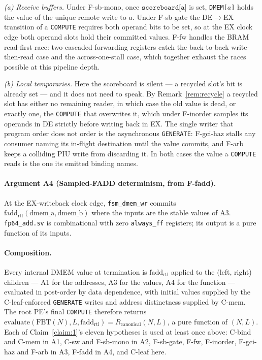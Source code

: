 \documentclass[journal,10pt]{IEEEtran}
\theoremstyle{plain}
\theoremstyle{definition}
\theoremstyle{remark}
\newcommand{\FBT}{\ensuremath{\mathrm{FBT}}}
\newcommand{\fadd}{\ensuremath{\mathrm{fadd}_{\mathrm{rtl}}}}
\newcommand{\Rcan}{\ensuremath{R_{\mathrm{canonical}}}}
\newcommand{\sv}[1]{\texttt{#1}}
\begin{document}
\emph{(a) Receive buffers.} Under \textsf{F-sb-mono}, once
$\texttt{scoreboard[a]}$ is set, \texttt{DMEM[$a$]} holds the value of the
unique remote write to $a$. Under \textsf{F-sb-gate} the
\textsf{DE}$\to$\textsf{EX} transition of a \texttt{COMPUTE} requires both
operand bits to be set, so at the EX clock edge both operand slots hold
their committed values. \textsf{F-fw} handles the BRAM read-first race:
two cascaded forwarding registers catch the back-to-back write-then-read
case and the across-one-stall case, which together exhaust the races
possible at this pipeline depth.

\emph{(b) Local temporaries.} Here the scoreboard is silent --- a recycled
slot's bit is already set --- and it does not need to speak. By
Remark~\ref{rem:recycle} a recycled slot has either no remaining reader,
in which case the old value is dead, or exactly one, the \texttt{COMPUTE}
that overwrites it, which under \textsf{F-inorder} samples its operands in
\textsf{DE} strictly before writing back in \textsf{EX}. The single writer
that program order does not order is the asynchronous \texttt{GENERATE}:
\textsf{F-gci-haz} stalls any consumer naming its in-flight destination
until the value commits, and \textsf{F-arb} keeps a colliding PIU write
from discarding it. In both cases the value a \texttt{COMPUTE} reads is
the one its emitted binding names.

\paragraph{Argument A4 (Sampled-FADD determinism, from \textsf{F-fadd}).}
At the EX-writeback clock edge, \sv{fsm\_dmem\_wr} commits
$\fadd(\text{dmem\_a}, \text{dmem\_b})$ where the inputs are the stable
values of A3. \sv{fp64\_add.sv} is combinational with zero \sv{always\_ff}
registers; its output is a pure function of its inputs.

\paragraph{Composition.} Every internal DMEM value at termination is
$\fadd$ applied to the (left, right) children --- A1 for the addresses, A3
for the values, A4 for the function --- evaluated in post-order by data
dependence, with initial values supplied by the \textsf{C-leaf}-enforced
\texttt{GENERATE} writes and address distinctness supplied by
\textsf{C-mem}. The root PE's final \texttt{COMPUTE} therefore returns
$\mathrm{evaluate}(\FBT(N), L, \fadd) = \Rcan(N, L)$, a pure function of
$(N, L)$. Each of Claim~\ref{claim:1}'s eleven hypotheses is used at least
once above: \textsf{C-bind} and \textsf{C-mem} in A1, \textsf{C-sw} and
\textsf{F-sb-mono} in A2, \textsf{F-sb-gate}, \textsf{F-fw},
\textsf{F-inorder}, \textsf{F-gci-haz} and \textsf{F-arb} in A3,
\textsf{F-fadd} in A4, and \textsf{C-leaf} here.
\end{document}

